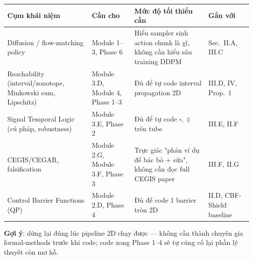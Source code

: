 \documentclass[a4paper,12pt]{article}
\begin{document}
\begin{tabularx}{\textwidth}{@{}l l X l@{}}
\toprule
Cụm khái niệm & Cần cho & Mức độ tối thiểu cần & Gắn với \\
\midrule
Diffusion / flow-matching policy & Module 1--3, Phase 6 & Hiểu sampler sinh action chunk là gì, không cần hiểu sâu training DDPM & Sec.~II.A, III.C \\
Reachability (interval/zonotope, Minkowski sum, Lipschitz) & Module 3.D, Module 4, Phase 1--3 & Đủ để tự code interval propagation 2D & III.D, IV, Prop.~1 \\
Signal Temporal Logic (cú pháp, robustness) & Module 3.E, Phase 2 & Đủ để tự code $\square,\lozenge$ trên tube & III.E, II.F \\
CEGIS/CEGAR, falsification & Module 2.G, Module 3.F, Phase 3 & Trực giác "phản ví dụ để bác bỏ + sửa", không cần đọc full CEGIS paper & III.F, II.G \\
Control Barrier Functions (QP) & Module 2.D, Phase 4 & Đủ để code 1 barrier tròn 2D & II.D, CBF-Shield baseline \\
\bottomrule
\end{tabularx}

\textbf{Gợi ý}: dừng lại đúng lúc pipeline 2D chạy được — không cần thành chuyên gia formal-methods trước khi code; code xong Phase 1--4 sẽ tự củng cố lại phần lý thuyết còn mơ hồ.

\end{document}
